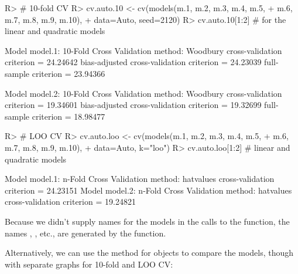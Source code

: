 \documentclass[
]{jss}
\begin{document}
\begin{CodeChunk}
\begin{CodeInput}
R> # 10-fold CV
R> cv.auto.10 <- cv(models(m.1, m.2, m.3, m.4, m.5,
+                      m.6, m.7, m.8, m.9, m.10),
+               data=Auto, seed=2120)
R> cv.auto.10[1:2] # for the linear and quadratic models
\end{CodeInput}
\begin{CodeOutput}

Model model.1:
10-Fold Cross Validation
method: Woodbury
cross-validation criterion = 24.24642
bias-adjusted cross-validation criterion = 24.23039
full-sample criterion = 23.94366 

Model model.2:
10-Fold Cross Validation
method: Woodbury
cross-validation criterion = 19.34601
bias-adjusted cross-validation criterion = 19.32699
full-sample criterion = 18.98477 
\end{CodeOutput}
\begin{CodeInput}
R> # LOO CV
R> cv.auto.loo <- cv(models(m.1, m.2, m.3, m.4, m.5,
+                         m.6, m.7, m.8, m.9, m.10),
+                  data=Auto, k="loo")
R> cv.auto.loo[1:2] # linear and quadratic models
\end{CodeInput}
\begin{CodeOutput}

Model model.1:
n-Fold Cross Validation
method: hatvalues
cross-validation criterion = 24.23151
Model model.2:
n-Fold Cross Validation
method: hatvalues
cross-validation criterion = 19.24821
\end{CodeOutput}
\end{CodeChunk}

Because we didn't supply names for the models in the calls to the
 function, the names , ,
etc., are generated by the function.

Alternatively, we can use the  method for
 objects to compare the models, though with separate
graphs for 10-fold and LOO CV:
\end{document}
